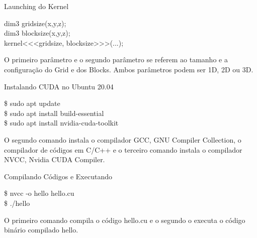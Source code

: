 \begin{frame}[t]{Launching do Kernel}
    \Large{
    \begin{shaded}
        dim3 grid\textunderscore size(x,y,z);\\
        dim3 block\textunderscore size(x,y,z);\\
        kernel\textless \textless \textless grid\textunderscore size, block\textunderscore size\textgreater \textgreater \textgreater (...);
    \end{shaded}
    }
    \justifying
    O primeiro parâmetro e o segundo parâmetro se referem ao tamanho e a configuração do Grid e dos Blocks. Ambos parâmetros podem ser 1D, 2D ou 3D.
\end{frame}
\begin{frame}[t]{Instalando CUDA no Ubuntu 20.04}
    \Large{
    \begin{shaded}
        \$ sudo apt update\\
        \$ sudo apt install build-essential\\ 
        \$ sudo apt install nvidia-cuda-toolkit\\
    \end{shaded}
    }
    \justifying
    O segundo comando instala o compilador GCC, GNU Compiler Collection, o compilador de códigos em C/C++ e o terceiro comando instala o compilador NVCC, Nvidia CUDA Compiler.
\end{frame}
\begin{frame}[t]{Compilando Códigos e Executando}
    \Large{
    \begin{shaded}
        \$ nvcc -o hello hello.cu \\
        \$ ./hello 
    \end{shaded}
    }
    \justifying
    O primeiro comando compila o código hello.cu e o segundo o executa o código binário compilado hello.
\end{frame}
